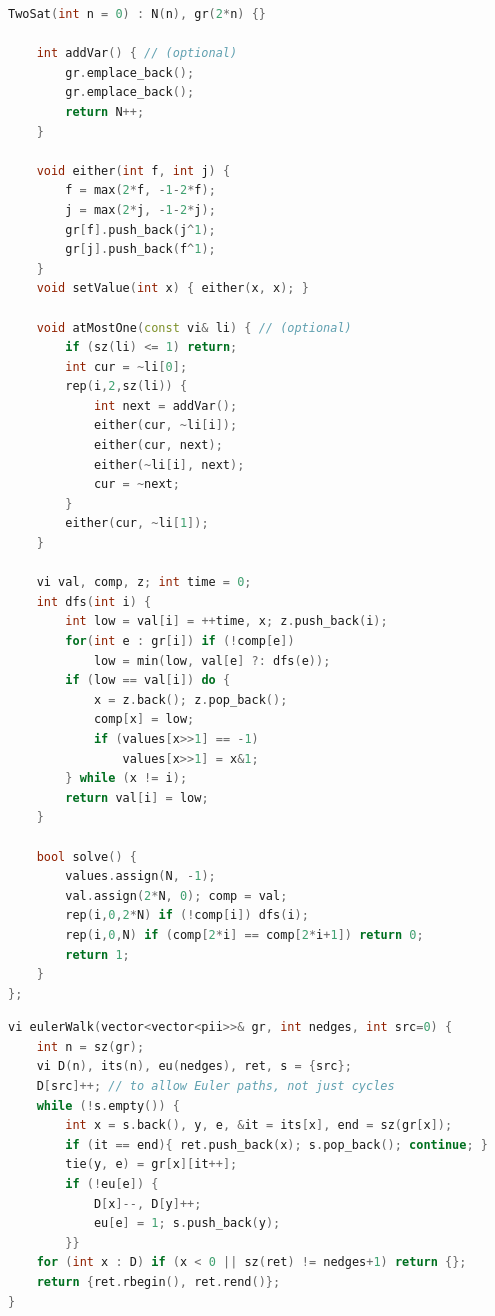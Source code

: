 \begin{multicols}{\Columns}
\begin{lstlisting}[language=C++]
	TwoSat(int n = 0) : N(n), gr(2*n) {}

	int addVar() { // (optional)
		gr.emplace_back();
		gr.emplace_back();
		return N++;
	}

	void either(int f, int j) {
		f = max(2*f, -1-2*f);
		j = max(2*j, -1-2*j);
		gr[f].push_back(j^1);
		gr[j].push_back(f^1);
	}
	void setValue(int x) { either(x, x); }

	void atMostOne(const vi& li) { // (optional)
		if (sz(li) <= 1) return;
		int cur = ~li[0];
		rep(i,2,sz(li)) {
			int next = addVar();
			either(cur, ~li[i]);
			either(cur, next);
			either(~li[i], next);
			cur = ~next;
		}
		either(cur, ~li[1]);
	}

	vi val, comp, z; int time = 0;
	int dfs(int i) {
		int low = val[i] = ++time, x; z.push_back(i);
		for(int e : gr[i]) if (!comp[e])
			low = min(low, val[e] ?: dfs(e));
		if (low == val[i]) do {
			x = z.back(); z.pop_back();
			comp[x] = low;
			if (values[x>>1] == -1)
				values[x>>1] = x&1;
		} while (x != i);
		return val[i] = low;
	}

	bool solve() {
		values.assign(N, -1);
		val.assign(2*N, 0); comp = val;
		rep(i,0,2*N) if (!comp[i]) dfs(i);
		rep(i,0,N) if (comp[2*i] == comp[2*i+1]) return 0;
		return 1;
	}
};
\end{lstlisting}

\begin{lstlisting}[language=C++]
vi eulerWalk(vector<vector<pii>>& gr, int nedges, int src=0) {
	int n = sz(gr);
	vi D(n), its(n), eu(nedges), ret, s = {src};
	D[src]++; // to allow Euler paths, not just cycles
	while (!s.empty()) {
		int x = s.back(), y, e, &it = its[x], end = sz(gr[x]);
		if (it == end){ ret.push_back(x); s.pop_back(); continue; }
		tie(y, e) = gr[x][it++];
		if (!eu[e]) {
			D[x]--, D[y]++;
			eu[e] = 1; s.push_back(y);
		}}
	for (int x : D) if (x < 0 || sz(ret) != nedges+1) return {};
	return {ret.rbegin(), ret.rend()};
}
\end{lstlisting}



\end{multicols}
